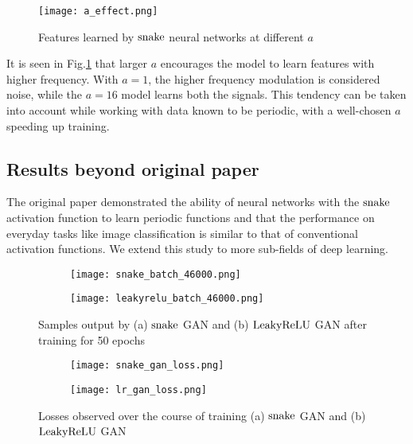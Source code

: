 \begin{figure}[h]
\centering
\texttt{[image: a\_effect.png]}
\caption{Features learned by $ \operatorname{snake} $ neural networks at different $a$}
\label{fig:a_effect}
\end{figure}

It is seen in Fig.\ref{fig:a_effect} that larger $a$ encourages the model to learn features with higher frequency. With $a = 1$, the higher frequency modulation is considered noise, while the $a = 16$ model learns both the signals. This tendency can be taken into account while working with data known to be periodic, with a well-chosen $a$ speeding up training.

\subsection{Results beyond original paper}
The original paper demonstrated the ability of neural networks with the $ \operatorname{snake} $ activation function to learn periodic functions and that the performance on everyday tasks like image classification is similar to that of conventional activation functions. We extend this study to more sub-fields of deep learning. \\

\begin{figure}[h]
  \centering
  \begin{subfigure}{0.35\textwidth}
  \centering
  \texttt{[image: snake\_batch\_46000.png]} 
  \caption{}
  \label{fig:subim3}
  \end{subfigure}
  \begin{subfigure}{0.35\textwidth}
  \centering
  \texttt{[image: leakyrelu\_batch\_46000.png]}
  \caption{}
  \label{fig:subim4}
  \end{subfigure}
  
  \caption{Samples output by (a) $ \operatorname{snake} $ GAN and (b) $ \operatorname{LeakyReLU} $ GAN after training for 50 epochs}
  \label{fig:gan_outputs}
  \end{figure}
  
  \begin{figure}[h]
    \centering
    \begin{subfigure}{0.45\textwidth}
      \centering
      \texttt{[image: snake\_gan\_loss.png]} 
      \caption{}
      \label{fig:subim5}
    \end{subfigure}
    \begin{subfigure}{0.45\textwidth}
      \centering
      \texttt{[image: lr\_gan\_loss.png]}
      \caption{}
      \label{fig:subim6}
    \end{subfigure}
    \caption{Losses observed over the course of training (a) $ \operatorname{snake} $ GAN and (b) $ \operatorname{LeakyReLU} $ GAN}
    \label{fig:gan_losses}
  \end{figure}


